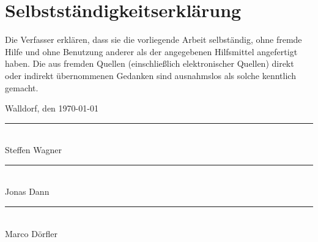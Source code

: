 \newpage
\thispagestyle{empty}
\section*{Selbstständigkeitserklärung}
\vspace{15mm}
 
Die Verfasser erklären, dass sie die vorliegende Arbeit selbständig, 
ohne fremde Hilfe und ohne Benutzung anderer als der angegebenen Hilfsmittel
angefertigt haben. 
Die aus fremden Quellen (einschließlich elektronischer Quellen) direkt oder 
indirekt übernommenen Gedanken sind ausnahmslos als solche kenntlich gemacht. 
 
\vspace{3cm} 
Walldorf, den \today
\vspace{1cm} 	
\begin{multicols}{3}
	\vspace{2cm}
	\rule{5cm}{.1pt}\\
	\vspace{5mm}
	Steffen Wagner
	
	\rule{5cm}{.1pt}\\
	\vspace{5mm}
	Jonas Dann

	\rule{5cm}{.1pt}\\
	\vspace{5mm}
	Marco Dörfler
\end{multicols}

\vspace{5cm}